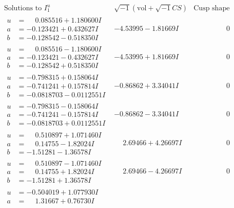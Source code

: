 \documentclass[1p]{elsarticle_modified}
\theoremstyle{definition}
\newcommand{\I}{\sqrt{-1}}
\begin{document}
$$\begin{array}{c|c|c}
\text{Solutions to }I^u_{1}& \I (\text{vol} + \sqrt{-1}CS) & \text{Cusp shape}\\
 \hline 
\begin{aligned}
u &= \phantom{-}0.085516 + 1.180600 I \\
a &= -0.123421 + 0.432627 I \\
b &= -0.128542 - 0.518350 I\end{aligned}
 & -4.53995 - 1.81669 I & \phantom{-0.000000 } 0 \\ \hline\begin{aligned}
u &= \phantom{-}0.085516 - 1.180600 I \\
a &= -0.123421 - 0.432627 I \\
b &= -0.128542 + 0.518350 I\end{aligned}
 & -4.53995 + 1.81669 I & \phantom{-0.000000 } 0 \\ \hline\begin{aligned}
u &= -0.798315 + 0.158064 I \\
a &= -0.741241 + 0.157814 I \\
b &= -0.0818703 - 0.0112551 I\end{aligned}
 & -0.86862 + 3.34041 I & \phantom{-0.000000 } 0 \\ \hline\begin{aligned}
u &= -0.798315 - 0.158064 I \\
a &= -0.741241 - 0.157814 I \\
b &= -0.0818703 + 0.0112551 I\end{aligned}
 & -0.86862 - 3.34041 I & \phantom{-0.000000 } 0 \\ \hline\begin{aligned}
u &= \phantom{-}0.510897 + 1.071460 I \\
a &= \phantom{-}0.14755 - 1.82024 I \\
b &= -1.51281 - 1.36578 I\end{aligned}
 & \phantom{-}2.69466 + 4.26697 I & \phantom{-0.000000 } 0 \\ \hline\begin{aligned}
u &= \phantom{-}0.510897 - 1.071460 I \\
a &= \phantom{-}0.14755 + 1.82024 I \\
b &= -1.51281 + 1.36578 I\end{aligned}
 & \phantom{-}2.69466 - 4.26697 I & \phantom{-0.000000 } 0 \\ \hline\begin{aligned}
u &= -0.504019 + 1.077930 I \\
a &= \phantom{-}1.31667 + 0.76730 I \\

\end{aligned}
\end{array}$$
\end{document}
